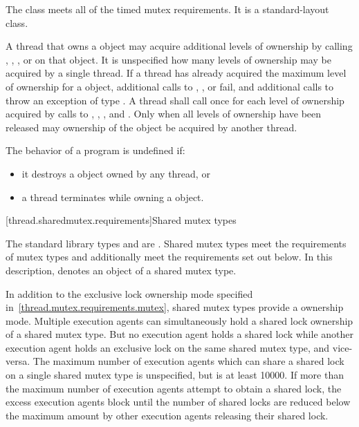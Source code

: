 \pnum
The class  meets
all of the timed mutex requirements.
It is a standard-layout class.

\pnum
A thread that owns a  object may acquire additional
levels of ownership by calling , ,
, or  on that object. It is
unspecified how many levels of ownership may be acquired by a single thread. If
a thread has already acquired the maximum level of ownership for a
 object, additional calls to ,
, or  fail, and additional
calls to  throw an exception of type . A
thread shall call  once for each level of ownership acquired by
calls to , , , and
. Only when all levels of ownership have been released
may ownership of the object be acquired by another thread.

\pnum
The behavior of a program is undefined if:
\begin{itemize}
\item it destroys a  object owned by any thread, or
\item a thread terminates while owning a  object.
\end{itemize}


[thread.sharedmutex.requirements]{Shared mutex types}

\pnum
The standard library types  and 
are . Shared mutex types meet the requirements of
mutex types and additionally
meet the requirements set out below. In this description,
 denotes an object of a shared mutex type.

\pnum
{}%
In addition to the exclusive lock ownership mode specified
in~\ref{thread.mutex.requirements.mutex}, shared mutex types provide a
 ownership mode. Multiple execution agents can
simultaneously hold a shared lock ownership of a shared mutex type. But no
execution agent holds a shared lock while another execution agent holds an
exclusive lock on the same shared mutex type, and vice-versa. The maximum
number of execution agents which can share a shared lock on a single shared
mutex type is unspecified, but is at least 10000. If more than the
maximum number of execution agents attempt to obtain a shared lock, the
excess execution agents block until the number of shared locks are
reduced below the maximum amount by other execution agents releasing their
shared lock.

